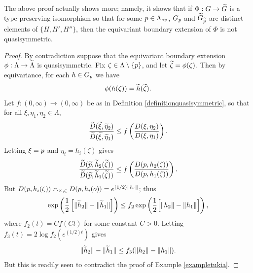 {\begin{remark}
\label{remarktukia}
The above proof actually shows more; namely, it shows that if $\Phi:G\to \widetilde G$ is a type-preserving isomorphism so that for some $p\in\Lambda_{\mathrm{bp}}$, $G_p$ and $\widetilde G_{\widetilde{p}}$ are distinct elements of $\{H,H',H''\}$, then the equivariant boundary extension of $\Phi$ is not quasisymmetric.
\end{remark}
\begin{proof}
By contradiction suppose that the equivariant boundary extension $\phi:\Lambda\to\widetilde\Lambda$ is quasisymmetric. Fix $\zeta\in \Lambda\setminus\{p\}$, and let $\widetilde\zeta = \phi(\zeta)$. Then by equivariance, for each $h\in G_p$ we have
\[
\phi(h(\zeta)) = \widetilde h(\widetilde\zeta).
\]
Let $f:(0,\infty)\to(0,\infty)$ be as in Definition \ref{definitionquasisymmetric}, so that for all $\xi,\eta_1,\eta_2\in \Lambda$,
\[
\frac{\widetilde{D}(\widetilde\xi,\widetilde\eta_2)}{\widetilde{D}(\widetilde\xi,\widetilde\eta_1)} \leq f\left(\frac{D(\xi,\eta_2)}{D(\xi,\eta_1)}\right).
\]
Letting $\xi = p$ and $\eta_i = h_i(\zeta)$ gives
\[
\frac{\widetilde{D}(\widetilde{p},\widetilde h_2(\widetilde\zeta))}{\widetilde{D}(\widetilde{p},\widetilde h_1(\widetilde\zeta))} \leq f\left(\frac{D(p,h_2(\zeta))}{D(p,h_1(\zeta))}\right).
\]
But $D(p,h_i(\zeta)) \asymp_{\times,\zeta} D(p,h_i(o)) = e^{(1/2)\|h_i\|}$; thus
\[
\exp\left(\frac12 \left[\|\widetilde h_2\| - \|\widetilde h_1\|\right]\right) \leq f_2\exp\left(\frac12 \Big[\|h_2\| - \|h_1\|\Big]\right),
\]
where $f_2(t) = Cf(Ct)$ for some constant $C > 0$. Letting $f_3(t) = 2\log f_2(e^{(1/2)t})$ gives
\[
\|\widetilde h_2\| - \|\widetilde h_1\| \leq f_3(\|h_2\| - \|h_1\|).
\]
But this is readily seen to contradict the proof of Example \ref{exampletukia}.
\end{proof}


}%